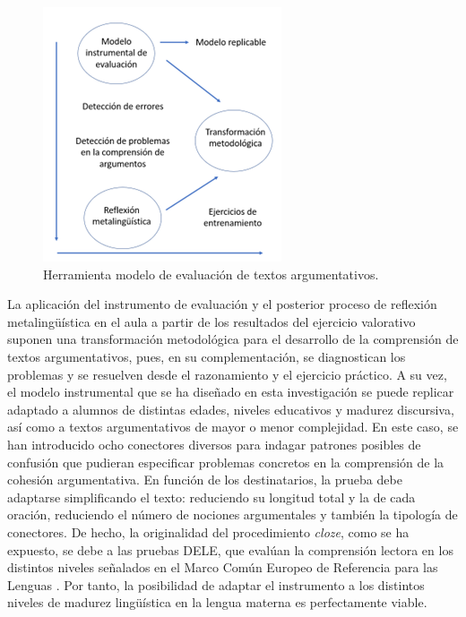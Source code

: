 \documentclass[spanish]{textolivre}
\begin{document}
\begin{figure}[htbp]
\centering
\begin{minipage}{.5\textwidth}
 \includegraphics[width=\textwidth]{Fig2.png}
 \caption{Herramienta modelo de evaluación de textos argumentativos.}
 \label{fig2}
\end{minipage}
\end{figure}

La aplicación del instrumento de evaluación y el posterior proceso de reflexión metalingüística en el aula a partir de los resultados del ejercicio valorativo suponen una transformación metodológica para el desarrollo de la comprensión de textos argumentativos, pues, en su complementación, se diagnostican los problemas y se resuelven desde el razonamiento y el ejercicio práctico. A su vez, el modelo instrumental que se ha diseñado en esta investigación se puede replicar adaptado a alumnos de distintas edades, niveles educativos y madurez discursiva, así como a textos argumentativos de mayor o menor complejidad. En este caso, se han introducido ocho conectores diversos para indagar patrones posibles de confusión que pudieran especificar problemas concretos en la comprensión de la cohesión argumentativa. En función de los destinatarios, la prueba debe adaptarse simplificando el texto: reduciendo su longitud total y la de cada oración, reduciendo el número de nociones argumentales y también la tipología de conectores. De hecho, la originalidad del procedimiento \emph{cloze}, como se ha expuesto, se debe a las pruebas DELE, que evalúan la comprensión lectora en los distintos niveles señalados en el Marco Común Europeo de Referencia para las Lenguas \cite{de2002marco}. Por tanto, la posibilidad de adaptar el instrumento a los distintos niveles de madurez lingüística en la lengua materna es perfectamente viable.
\end{document}
